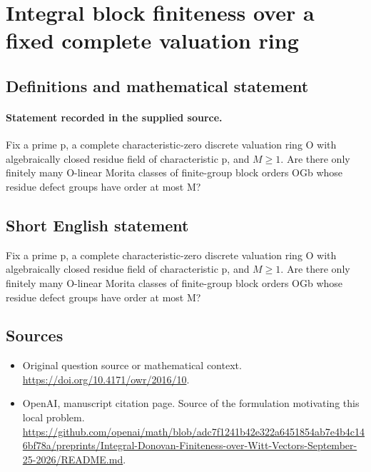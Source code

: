 \documentclass[11pt]{article}
\begin{document}
\section*{Integral block finiteness over a fixed complete valuation ring}\label{statement}
\subsection{Definitions and mathematical statement}
\paragraph{Statement recorded in the supplied source.}
Fix a prime p, a complete characteristic-zero discrete valuation ring O with algebraically closed residue field of characteristic p, and $M\geq 1$. Are there only finitely many O-linear Morita classes of finite-group block orders OGb whose residue defect groups have order at most M?
\subsection{Short English statement}
Fix a prime p, a complete characteristic-zero discrete valuation ring O with algebraically closed residue field of characteristic p, and $M\geq 1$. Are there only finitely many O-linear Morita classes of finite-group block orders OGb whose residue defect groups have order at most M?
\subsection{Sources}
\begin{itemize}
\item[S1] Original question source or mathematical context.
\url{https://doi.org/10.4171/owr/2016/10}.
\item[S2] OpenAI, manuscript citation page. Source of the formulation motivating this local problem.
\url{https://github.com/openai/math/blob/adc7f1241b42e322a6451854ab7e4b4c146bf78a/preprints/Integral-Donovan-Finiteness-over-Witt-Vectors-September-25-2026/README.md}.
\end{itemize}
\end{document}
